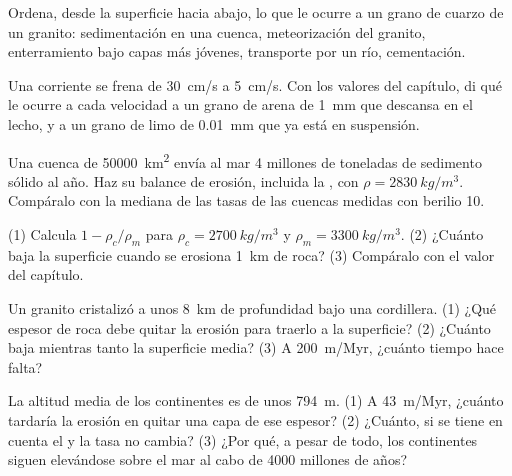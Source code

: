 \begin{exercise}[$\star$]\label{exo:g12:destruction-of-mountains:5}
Ordena, desde la superficie hacia abajo, lo que le ocurre a un grano de cuarzo
de un granito: sedimentación en una cuenca, meteorización del granito,
enterramiento bajo capas más jóvenes, transporte por un río, cementación.
\end{exercise}

\begin{exercise}[$\star\star$]\label{exo:g12:destruction-of-mountains:6}
Una corriente se frena de \qty{30}{cm/s} a \qty{5}{cm/s}. Con los valores del
capítulo, di qué le ocurre a cada velocidad a un grano de arena de
\qty{1}{mm} que descansa en el lecho, y a un grano de limo de \qty{0.01}{mm}
que ya está en suspensión.
\end{exercise}

\begin{exercise}[$\star\star$]\label{exo:g12:destruction-of-mountains:7}
Una cuenca de \qty{50000}{km^2} envía al mar 4 millones de toneladas de
sedimento sólido al año. Haz su balance de erosión, incluida la , con $\rho =
\qty{2830}{kg/m^3}$. Compáralo con la mediana de las
tasas de las cuencas medidas con berilio 10.
\end{exercise}

\begin{exercise}[$\star\star$]\label{exo:g12:destruction-of-mountains:8}
(1) Calcula $1 - \rho_c/\rho_m$ para $\rho_c = \qty{2700}{kg/m^3}$ y
$\rho_m = \qty{3300}{kg/m^3}$. (2) ¿Cuánto baja la superficie cuando se
erosiona \qty{1}{km} de roca? (3) Compáralo con el valor del capítulo.
\end{exercise}

\begin{exercise}[$\star\star$]\label{exo:g12:destruction-of-mountains:9}
Un granito cristalizó a unos \qty{8}{km} de profundidad bajo una cordillera.
(1) ¿Qué espesor de roca debe quitar la erosión para traerlo a la superficie?
(2) ¿Cuánto baja mientras tanto la superficie media? (3) A \qty{200}{m/Myr},
¿cuánto tiempo hace falta?
\end{exercise}

\begin{exercise}[$\star\star$]\label{exo:g12:destruction-of-mountains:10}
La altitud media de los continentes es de unos \qty{794}{m}. (1) A
\qty{43}{m/Myr}, ¿cuánto tardaría la erosión en quitar una capa de ese
espesor? (2) ¿Cuánto, si se tiene en cuenta el  y la tasa no
cambia? (3) ¿Por qué, a pesar de todo, los continentes siguen elevándose sobre
el mar al cabo de 4000 millones de años?
\end{exercise}

